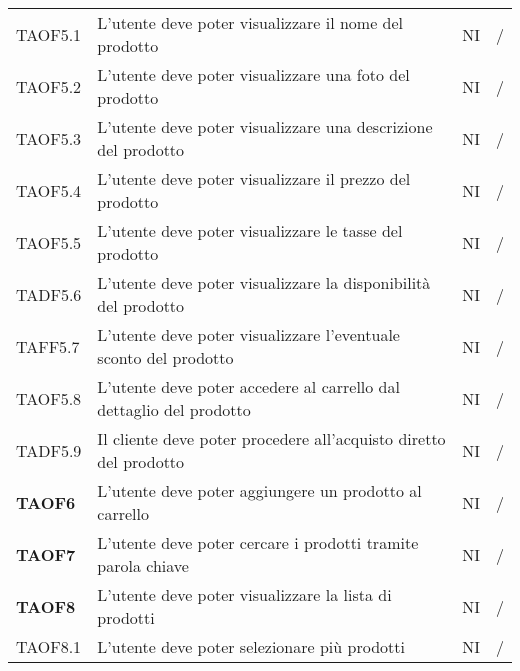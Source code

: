 \begin{center}
\begin{longtable}[!h]{p{60px} p{240px} p{35px} p{35px}}
        TAOF5.1         & L'utente deve poter visualizzare il nome del prodotto                                               & NI             & /              \\
        TAOF5.2         & L'utente deve poter visualizzare una foto del prodotto                                              & NI             & /              \\
        TAOF5.3         & L'utente deve poter visualizzare una descrizione del prodotto                                       & NI             & /              \\
        TAOF5.4         & L'utente deve poter visualizzare il prezzo del prodotto                                             & NI             & /              \\
        TAOF5.5         & L'utente deve poter visualizzare le tasse del prodotto                                              & NI             & /              \\
        TADF5.6         & L'utente deve poter visualizzare la disponibilità del prodotto                                      & NI             & /              \\
        TAFF5.7         & L'utente deve poter visualizzare l'eventuale sconto del prodotto                                    & NI             & /              \\
        TAOF5.8         & L'utente deve poter accedere al carrello dal dettaglio del prodotto                                 & NI             & /              \\
        TADF5.9         & Il cliente deve poter procedere all'acquisto diretto del prodotto                                   & NI             & /              \\
        \textbf{TAOF6}  & L'utente deve poter aggiungere un prodotto al carrello                                              & NI             & /              \\
        \textbf{TAOF7}  & L'utente deve poter cercare i prodotti tramite parola chiave                                        & NI             & /              \\
        \textbf{TAOF8}  & L'utente deve poter visualizzare la lista di prodotti                                               & NI             & /              \\
        TAOF8.1         & L'utente deve poter selezionare più prodotti                                                        & NI             & /              \\

\end{longtable}
\end{center}

